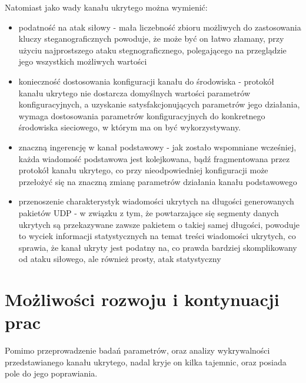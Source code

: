 \documentclass[a4paper, twoside, 12pt]{report}
\begin{document}
    Natomiast jako wady kanału ukrytego można wymienić:
    \begin{itemize}
        \item podatność na atak siłowy - mała liczebność zbioru możliwych do zastosowania
            kluczy steganograficznych powoduje, że może być on łatwo złamany,
            przy użyciu najprostszego ataku stegnograficznego, polegającego
            na przeglądzie jego wszystkich możliwych wartości
        \item konieczność dostosowania konfiguracji kanału do środowiska - protokół
            kanału ukrytego nie dostarcza domyślnych wartości parametrów konfiguracyjnych, a
            uzyskanie satysfakcjonujących parametrów jego działania, wymaga dostosowania
            parametrów konfiguracyjnych do konkretnego środowiska sieciowego,
            w którym ma on być wykorzystywany.
        \item znaczną ingerencję w kanał podstawowy - jak zostało wspomniane wcześniej,
            każda wiadomość podstawowa jest kolejkowana, bądź fragmentowana przez
            protokół kanału ukrytego, co przy nieodpowiedniej konfiguracji może
            przełożyć się na znaczną zmianę parametrów działania kanału podstawowego
        \item przenoszenie charakterystyk wiadomości ukrytych na długości generowanych pakietów UDP -
            w związku z tym, że powtarzające się segmenty danych ukrytych są przekazywane
            zawsze pakietem o takiej samej długości, powoduje to wyciek informacji
            statystycznych na temat treści wiadomości ukrytych, co sprawia, że
            kanał ukryty jest podatny na, co prawda bardziej skomplikowany od ataku siłowego,
            ale również prosty, atak statystyczny

    \end{itemize}
\chapter{Możliwości rozwoju i kontynuacji prac}
    Pomimo przeprowadzenie badań parametrów, oraz analizy wykrywalności przedstawianego kanału
    ukrytego, nadal kryje on kilka tajemnic, oraz posiada pole do jego poprawiania.
\end{document}
